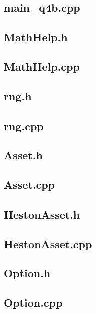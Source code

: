 \documentclass[12pt]{article}
\begin{document}
\subsection{main\_q4b.cpp}


\subsection{MathHelp.h}

\subsection{MathHelp.cpp}


\subsection{rng.h}

\subsection{rng.cpp}


\subsection{Asset.h}

\subsection{Asset.cpp}


\subsection{HestonAsset.h}

\subsection{HestonAsset.cpp}


\subsection{Option.h}

\subsection{Option.cpp}

\end{document}
